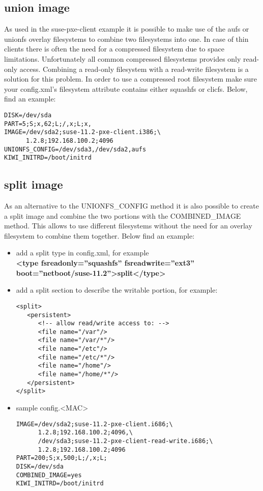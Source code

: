 \subsection{union image}

As used in the suse-pxe-client example it is possible to make use of the
aufs or unionfs overlay filesystems to combine two filesystems
into one. In case of thin clients there is often the need for
a compressed filesystem due to space limitations. Unfortunately
all common compressed filesystems provides only read-only access.
Combining a read-only filesystem with a read-write filesystem
is a solution for this problem. In order to use a compressed
root filesystem make sure your config.xml's filesystem attribute
contains either squashfs or clicfs. Below, find an example:

\begin{Command}{12cm}
\begin{verbatim}
DISK=/dev/sda
PART=5;S;x,62;L;/,x;L;x,
IMAGE=/dev/sda2;suse-11.2-pxe-client.i386;\
      1.2.8;192.168.100.2;4096
UNIONFS_CONFIG=/dev/sda3,/dev/sda2,aufs
KIWI_INITRD=/boot/initrd
\end{verbatim}
\end{Command}

\subsection{split image}

As an alternative to the UNIONFS\_CONFIG method it is also
possible to create a split image and combine the two portions
with the COMBINED\_IMAGE method. This allows to use different
filesystems without the need for an overlay filesystem to combine
them together. Below find an example:

\begin{itemize}
\item add a split type in config.xml, for example\\
      \textbf{<type fsreadonly=''squashfs'' fsreadwrite=''ext3''
      boot=''netboot/suse-11.2''>split</type>}
\item add a split section to describe the writable portion,
      for example:
\begin{verbatim}
<split>
   <persistent>
      <!-- allow read/write access to: -->
      <file name="/var"/>
      <file name="/var/*"/>
      <file name="/etc"/>
      <file name="/etc/*"/>
      <file name="/home"/>
      <file name="/home/*"/>
   </persistent>
</split>
\end{verbatim}
\item sample config.<MAC>
     
\begin{Command}{14cm}
\begin{verbatim}
IMAGE=/dev/sda2;suse-11.2-pxe-client.i686;\
      1.2.8;192.168.100.2;4096,\
      /dev/sda3;suse-11.2-pxe-client-read-write.i686;\
      1.2.8;192.168.100.2;4096
PART=200;S;x,500;L;/,x;L;
DISK=/dev/sda
COMBINED_IMAGE=yes
KIWI_INITRD=/boot/initrd
\end{verbatim}
\end{Command}
\end{itemize}

